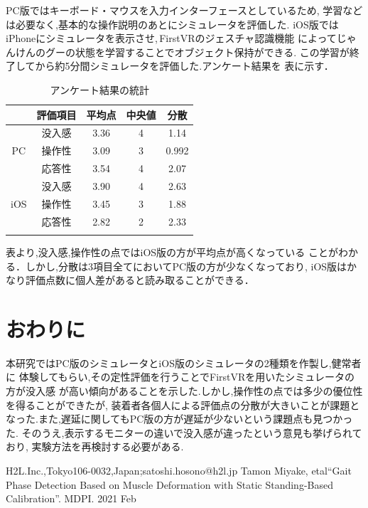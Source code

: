 \documentclass{ltjsarticle}
\begin{document}
		PC版ではキーボード・マウスを入力インターフェースとしているため,
		学習などは必要なく,基本的な操作説明のあとにシミュレータを評価した.
		iOS版ではiPhoneにシミュレータを表示させ,\,FirstVRのジェスチャ認識機能
		によってじゃんけんのグーの状態を学習することでオブジェクト保持ができる.
		この学習が終了してから約5分間シミュレータを評価した.アンケート結果を
		表に示す．
		
		\vspace{-10pt}
		\begin{table}[H]
		\begin{center}
		\caption{アンケート結果の統計}
		\label{tab:resoult}
		\begin{tabular}{cc|ccc} \Hline
		&評価項目&平均点&中央値&分散\\ \hline
		&没入感&3.36&4&1.14\\
		PC&操作性&3.09&3&0.992\\
		&応答性&3.54&4&2.07\\ \hline
		&没入感&3.90&4&2.63\\
		iOS&操作性&3.45&3&1.88\\
		&応答性&2.82&2&2.33\\ \Hline
		\end{tabular}
		\end{center}
		\end{table}

		表より,没入感,操作性の点ではiOS版の方が平均点が高くなっている
		ことがわかる．しかし,分散は3項目全てにおいてPC版の方が少なくなっており,
		iOS版はかなり評価点数に個人差があると読み取ることができる．


\section{おわりに}
	本研究ではPC版のシミュレータとiOS版のシミュレータの2種類を作製し,健常者に
	体験してもらい,その定性評価を行うことでFirstVRを用いたシミュレータの方が没入感
	が高い傾向があることを示した.しかし,操作性の点では多少の優位性を得ることができたが,
	装着者各個人による評価点の分散が大きいことが課題となった.また,遅延に関してもPC版の方が遅延が少ないという課題点も見つかった.
	そのうえ,表示するモニターの違いで没入感が違ったという意見も挙げられており,
	実験方法を再検討する必要がある.

\begin{thebibliography}{99}%
	\begin{spacing}{0.8}

			H2L.Inc.,Tokyo106-0032,Japan;satoshi.hosono@h2l.jp
			Tamon Miyake, etal``Gait Phase Detection Based on Muscle Deformation
			with Static Standing-Based Calibration''.
			MDPI. 2021 Feb

	\end{spacing}
\end{thebibliography}
\end{document}
